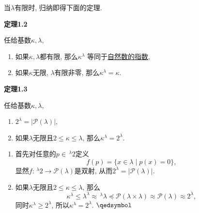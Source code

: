 \documentclass[UTF8]{ctexart}
\begin{document}
当$\lambda$有限时, 归纳即得下面的定理.

\vspace{10pt}

\hypertarget{sec:定理1.2}{}
\noindent\textbf{定理1.2}

任给基数$\kappa,\lambda$,
\begin{enumerate}
    \item 如果$\kappa,\lambda$都有限, 那么$\kappa^\lambda$
    等同于\href{../../03 自然数/02 自然数算术/03 自然数的指数#nameddest=sec:定义1.1}
    {自然数的指数},
    \item 如果$\kappa$无限, $\lambda$有限非零, 那么$\kappa^\lambda=\kappa$.
\end{enumerate}

\vspace{10pt}

\hypertarget{sec:定理1.3}{}
\noindent\textbf{定理1.3}

任给基数$\kappa,\lambda$,
\begin{enumerate}
    \item $2^\lambda=|\mathcal{P}(\lambda)|$,
    \item 如果$\lambda$无限且$2\leqslant\kappa\leqslant\lambda$,
    那么$\kappa^\lambda=2^\lambda$.
\end{enumerate}



\begin{enumerate}
    \item 首先对任意的$p\in\,\!^\lambda2$定义
    \[
        f(p)=\{x\in\lambda\mid p(x)=0\},
    \]
    显然$f:\,\!^\lambda2\to\mathcal{P}(\lambda)$是双射,
    从而$2^\lambda=|\mathcal{P}(\lambda)|$.
    \item 如果$\lambda$无限且$2\leqslant\kappa\leqslant\lambda$, 那么
    \[
        \kappa^\lambda\leqslant\lambda^\lambda\approx\,\!^\lambda\lambda
        \preccurlyeq\mathcal{P}(\lambda\times\lambda)\approx
        \mathcal{P}(\lambda)\approx 2^\lambda,
    \]
    同时$\kappa^\lambda\geqslant 2^\lambda$,
    所以$\kappa^\lambda=2^\lambda$. \hfill $\qedsymbol$
\end{enumerate}

\end{document}
